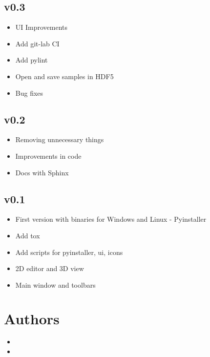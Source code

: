 \documentclass[a4paper,10pt,english]{sphinxmanual}
\begin{document}
\section{v0.3}
\label{\detokenize{changes:v0-3}}\begin{itemize}
\item {} 
UI Improvements

\item {} 
Add git-lab CI

\item {} 
Add pylint

\item {} 
Open and save samples in HDF5

\item {} 
Bug fixes

\end{itemize}


\section{v0.2}
\label{\detokenize{changes:v0-2}}\begin{itemize}
\item {} 
Removing unnecessary things

\item {} 
Improvements in code

\item {} 
Docs with Sphinx

\end{itemize}


\section{v0.1}
\label{\detokenize{changes:v0-1}}\begin{itemize}
\item {} 
First version with binaries for Windows and Linux - Pyinstaller

\item {} 
Add tox

\item {} 
Add scripts for pyinstaller, ui, icons

\item {} 
2D editor and 3D view

\item {} 
Main window and toolbars

\end{itemize}


\chapter{Authors}
\label{\detokenize{authors:authors}}\label{\detokenize{authors::doc}}\begin{itemize}
\item {} 

\item {} 

\end{itemize}
\end{document}
